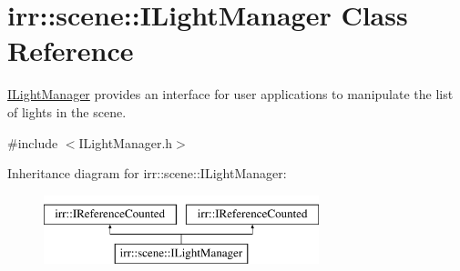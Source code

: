 \hypertarget{classirr_1_1scene_1_1ILightManager}{}\section{irr\+:\+:scene\+:\+:I\+Light\+Manager Class Reference}
\label{classirr_1_1scene_1_1ILightManager}


\hyperlink{classirr_1_1scene_1_1ILightManager}{I\+Light\+Manager} provides an interface for user applications to manipulate the list of lights in the scene.  




{\ttfamily \#include $<$I\+Light\+Manager.\+h$>$}

Inheritance diagram for irr\+:\+:scene\+:\+:I\+Light\+Manager\+:\begin{figure}[H]
\begin{center}
\leavevmode
\includegraphics[height=2.000000cm]{classirr_1_1scene_1_1ILightManager}
\end{center}
\end{figure}
